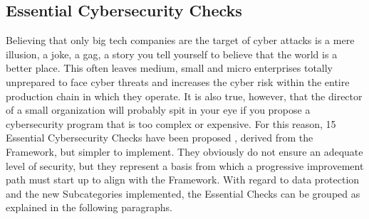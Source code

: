\subsection{Essential Cybersecurity Checks}
Believing that only big tech companies are the target of cyber attacks is a mere illusion, a joke, a gag, a story you tell yourself to believe that the world is a better place. This often leaves medium, small and micro enterprises totally unprepared to face cyber threats and increases the cyber risk within the entire production chain in which they operate. It is also true, however, that the director of a small organization will probably spit in your eye if you propose a cybersecurity program that is too complex or expensive. For this reason, 15 Essential Cybersecurity Checks have been proposed \cite{CISSAP2016}, derived from the Framework, but simpler to implement. They obviously do not ensure an adequate level of security, but they represent a basis from which a progressive improvement path must start up to align with the Framework. With regard to data protection and the new Subcategories implemented, the Essential Checks can be grouped as explained in the following paragraphs.
